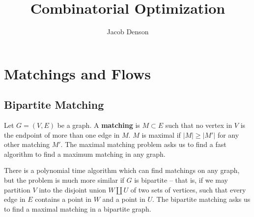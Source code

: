

\DeclareMathOperator{\Dom}{Dom}
\DeclareMathOperator{\delin}{\delta_{\text{in}}}
\DeclareMathOperator{\delout}{\delta_{\text{out}}}

\def\@fnsymbol#1{\ensuremath{\ifcase#1\or *\or \dagger\or \ddagger\or
   \mathsection\or \mathparagraph\or \|\or **\or \dagger\dagger
   \or \ddagger\ddagger \else\@ctrerr\fi}}
\renewcommand{\thefootnote}{\fnsymbol{footnote}}

\title{Combinatorial Optimization}
\author{Jacob Denson}




\maketitle

\tableofcontents


\chapter{Matchings and Flows}

\section{Bipartite Matching}

Let $G = (V,E)$ be a graph. A {\bf matching} is $M \subset E$ such that no vertex in $V$ is the endpoint of more than one edge in $M$. $M$ is maximal if $|M| \geq |M'|$ for any other matching $M'$. The maximal matching problem asks us to find a fast algorithm to find a maximum matching in any graph.

There is a polynomial time algorithm which can find matchings on any graph, but the problem is much more similar if $G$ is bipartite -- that is, if we may partition $V$ into the disjoint union $W \amalg U$ of two sets of vertices, such that every edge in $E$ contains a point in $W$ and a point in $U$. The bipartite matching asks us to find a maximal matching in a bipartite graph.


